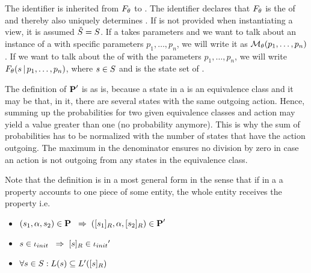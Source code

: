 \documentclass[preview]{standalone}
\begin{document}
The identifier \viewppty is inherited from ${F_{{\theta}}}$ to \view. The identifier declares that ${F_{{\theta}}}$ is the \grpfctN of \view and thereby also uniquely determines \view. If \smstates is not provided when instantiating a view, it is assumed ${\tilde{{S}}} = {S}$. If a \viewN takes parameters and we want to talk about an instance of a \viewN with specific parameters $p_1, \dots, p_n$, we will write it as ${{{{\mathcal{M}}}}_{{\theta}}}(p_1, \dots, p_n)$. If we want to talk about the \grpfctN \grpfct of \view with the parameters $p_1, \dots, p_n$, we will write ${F_{{\theta}}}({s} {\,|\,} p_1, \dots, p_n)$, where ${s} \in {S}$ and \states is the state set of \chgph. 

The definition of ${{\textbf{P}}}'$ is as is, because a state in a \viewN is an equivalence class and it may be that, in it, there are several states with the same outgoing action. Hence, summing up the probabilities for two given equivalence classes and action \action may yield a value greater than one (no probability anymore). This is why the sum of  probabilities has to be normalized with the number of states that have the action \action outgoing. The maximum in the denominator ensures no division by zero in case an action is not outgoing from any states in the equivalence class.

Note that the definition is in a most general form in the sense that if in a \viewN a property accounts to one piece of some entity, the whole entity receives the property i.e. 
\begin{itemize}	
	\item $({s}_1, {\alpha}, {s}_2) \in {\ensuremath{{\textbf{P}}}} {\hspace{3mm}\Rightarrow\hspace{2mm}} ({{[{s}_1]_{{R}}}}, {\alpha}, {{[{s}_2]_{{R}}}}) \in {\ensuremath{{\textbf{P}}}}'$
	\item ${s} \in {\ensuremath{{\iota_{init}}}} {\hspace{3mm}\Rightarrow\hspace{2mm}} {\ensuremath{{[{s}]_{{R}}}}} \in {\iota_{init}}'$
	\item $\forall {s} \in {S} : {L}({s}) \subseteq {L}'({{[{s}]_{{R}}}})$
\end{itemize}
\end{document}
